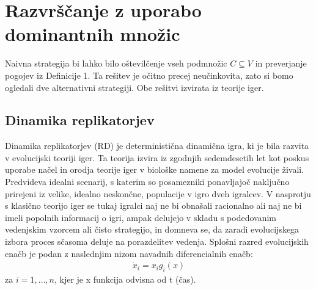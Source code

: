 \documentclass[a4paper]{article}
\begin{document}
\section{Razvrščanje z uporabo dominantnih množic}
Naivna strategija bi lahko bilo oštevilčenje vseh podmnožic $C\subseteq V$ in preverjanje pogojev iz Definicije 1. Ta rešitev je očitno precej neučinkovita, zato si bomo ogledali dve alternativni strategiji. Obe rešitvi izvirata iz teorije iger.

\subsection{Dinamika replikatorjev}
Dinamika replikatorjev (RD) je deterministična dinamična igra, ki je bila razvita v evolucijski teoriji iger. Ta teorija izvira iz zgodnjih sedemdesetih let kot poskus uporabe načel in orodja teorije iger v biološke namene za model evolucije živali. Predvideva idealni scenarij, s katerim so posamezniki ponavljajoč naključno prirejeni iz velike, idealno neskončne, populacije v igro dveh igralcev. V nasprotju s klasično teorijo iger se tukaj igralci naj ne bi obnašali racionalno ali naj ne bi imeli popolnih informacij o igri, ampak delujejo v skladu s podedovanim vedenjskim vzorcem ali čisto strategijo, in domneva se, da zaradi evolucijskega izbora proces sčasoma deluje na porazdelitev vedenja. Splošni razred evolucijskih enačb je podan z naslednjim nizom navadnih diferencialnih enačb:
\begin{gather}
\dot{x}_i = x_i g_i (x)
\end{gather}
za $i = 1,\ldots,n$, kjer je x funkcija odvisna od t (čas).
\end{document}
